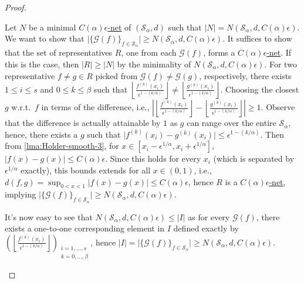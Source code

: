 \begin{proof}
\begin{explanation}
		Let \(N\) be a minimal \hyperref[def:eps-net]{\(C(\alpha )\epsilon \)-net} of \((\mathcal{S} _\alpha , d )\) such that \(\vert N \vert = N(\mathcal{S} _\alpha , d, C(\alpha )\epsilon)\). We want to show that \(\vert \{ \mathcal{G} (f) \}_{f\in \mathcal{S} _\alpha } \vert \geq N(\mathcal{S} _\alpha , d, C(\alpha )\epsilon )\). It suffices to show that the set of representatives \(R\), one from each \(\mathcal{G} (f)\), forms a \hyperref[def:eps-net]{\(C(\alpha )\epsilon \)-net}. If this is the case, then \(\vert R \vert \geq \vert N \vert \) by the minimality of \(N(\mathcal{S} _\alpha , d , C(\alpha )\epsilon)\). For two representative \(f \neq g \in R\) picked from \(\mathcal{G} (f) \neq \mathcal{G} (g)\), respectively, there exists \(1 \leq i \leq s\) and \(0 \leq k \leq \beta \) such that \(\left\lfloor \frac{f^{(k)}(x_i)}{\epsilon ^{1 - (k / \alpha )}} \right\rfloor \neq \left\lfloor \frac{g^{(k)}(x_i)}{\epsilon ^{1 - (k / \alpha )}} \right\rfloor\). Choosing the closest \(g\) w.r.t.\ \(f\) in terms of the difference, i.e., \(\left\vert \left\lfloor \frac{f^{(k)}(x_i)}{\epsilon ^{1 - (k / \alpha )}} \right\rfloor - \left\lfloor \frac{g^{(k)}(x_i)}{\epsilon ^{1 - (k / \alpha )}} \right\rfloor \right\vert \geq 1\). Observe that the difference is actually attainable by \(1\) as \(g\) can range over the entire \(\mathcal{S} _\alpha \), hence, there exists a \(g\) such that \(\vert f^{(k)}(x_i) - g^{(k)}(x_i) \vert \leq \epsilon ^{1 - (k / \alpha )}\). Then from \autoref{lma:Holder-smooth-3}, for \(x \in [x_i - \epsilon ^{1 / \alpha }, x_i + \epsilon ^{1 / \alpha }]\), \(\vert f(x) - g(x) \vert \leq C(\alpha )\epsilon\). Since this holds for every \(x_i\) (which is separated by \(\epsilon ^{1 / \alpha }\) exactly), this bounds extends for all \(x\in (0, 1)\), i.e., \(d (f, g) = \sup _{0 < x < 1} \vert f(x) - g(x) \vert \leq C(\alpha )\epsilon\), hence \(R\) is a \hyperref[def:eps-net]{\(C(\alpha )\epsilon \)-net}, implying \(\vert \{ \mathcal{G} (f) \}_{f\in \mathcal{S} _\alpha } \vert \geq N(\mathcal{S} _\alpha , d , C(\alpha )\epsilon)\).

		It's now easy to see that \(N(\mathcal{S} _\alpha , d , C(\alpha )\epsilon ) \leq \vert I \vert \) as for every \(\mathcal{G} (f)\), there exists a one-to-one corresponding element in \(I\) defined exactly by \(\left( \left\lfloor \frac{f^{(k)}(x_i)}{\epsilon ^{1 - (k / \alpha )}} \right\rfloor \right) _{\substack{i = 1, \dots , s \\ k = 0, \dots , \beta }}\), hence \(\vert I \vert = \vert \{ \mathcal{G} (f) \}_{f\in \mathcal{S} _\alpha }\vert \geq N(\mathcal{S} _\alpha , d , C(\alpha )\epsilon)\).
	\end{explanation}


\end{proof}
